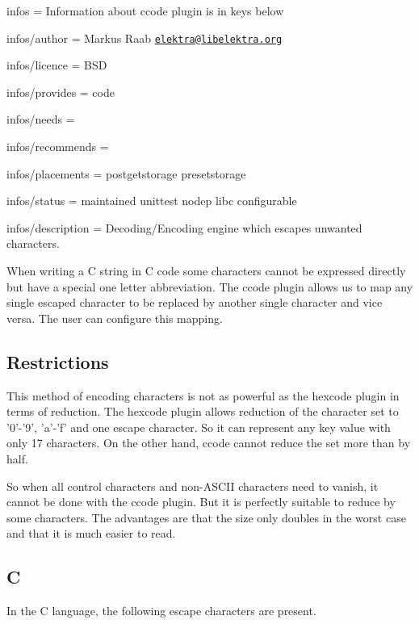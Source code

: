 
\begin{DoxyItemize}
\item infos = Information about ccode plugin is in keys below
\item infos/author = Markus Raab \href{mailto:elektra@libelektra.org}{\tt elektra@libelektra.\+org}
\item infos/licence = B\+S\+D
\item infos/provides = code
\item infos/needs =
\item infos/recommends =
\item infos/placements = postgetstorage presetstorage
\item infos/status = maintained unittest nodep libc configurable
\item infos/description = Decoding/\+Encoding engine which escapes unwanted characters.
\end{DoxyItemize}

When writing a C string in C code some characters cannot be expressed directly but have a special one letter abbreviation. The ccode plugin allows us to map any single escaped character to be replaced by another single character and vice versa. The user can configure this mapping.

\subsection*{Restrictions}

This method of encoding characters is not as powerful as the hexcode plugin in terms of reduction. The hexcode plugin allows reduction of the character set to '0'-\/'9', 'a'-\/'f' and one escape character. So it can represent any key value with only 17 characters. On the other hand, ccode cannot reduce the set more than by half.

So when all control characters and non-\/\+A\+S\+C\+I\+I characters need to vanish, it cannot be done with the ccode plugin. But it is perfectly suitable to reduce by some characters. The advantages are that the size only doubles in the worst case and that it is much easier to read.

\subsection*{C}

In the C language, the following escape characters are present.


